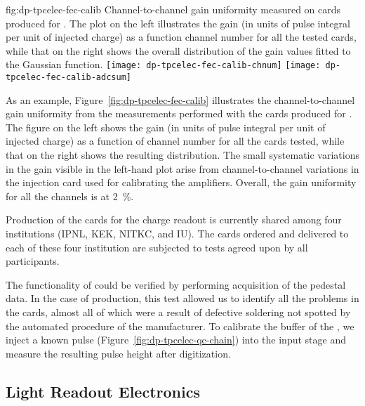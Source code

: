 \begin{dunefigure}{fig:dp-tpcelec-fec-calib}
{Channel-to-channel gain uniformity measured on  cards produced for . The plot on the left illustrates the gain (in units of pulse integral per unit of injected charge) as a function channel number for all the tested cards, while that on the right shows the overall distribution of the gain values fitted to the Gaussian function.}
\texttt{[image: dp-tpcelec-fec-calib-chnum]}
\texttt{[image: dp-tpcelec-fec-calib-adcsum]}
\end{dunefigure}

As an example, Figure~\ref{fig:dp-tpcelec-fec-calib} illustrates the channel-to-channel gain uniformity from the measurements performed with the  cards produced for . The figure on the left shows the gain (in units of pulse integral per unit of injected charge) as a function of channel number for all the cards tested, while that on the right shows the resulting distribution. The small systematic variations in the gain visible in the left-hand plot arise from channel-to-channel variations in the injection card used for calibrating the  amplifiers. Overall, the gain uniformity for all the channels is at \SI{2}{\percent}.

Production of the  cards for the charge readout is currently shared among four institutions (IPNL, KEK, NITKC, and IU). 
The cards ordered and delivered to each of these four institution are subjected to  tests agreed upon by all participants. 

The functionality of  could be verified by performing acquisition of the pedestal data. In the case of  production, this test allowed us to identify all the problems in the cards, almost all of which were a result of defective soldering not spotted by the automated  procedure of the manufacturer. To calibrate the  buffer of the  , we inject a known pulse (Figure~\ref{fig:dp-tpcelec-qc-chain}) into the input stage and measure the resulting pulse height after digitization. 


\subsection{Light Readout Electronics}
\label{ssec:dp-tpcelec-prod-lro}


